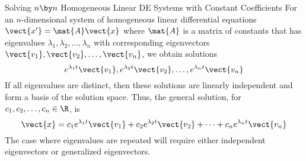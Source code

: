 \documentclass{beamer}
\begin{document}
\begin{frame}
\begin{block}{\small Solving $n\by n$ Homogeneous Linear DE Systems with Constant Coefficients}
For an $n$-dimensional system of homogeneous linear differential equations $\vect{x^\prime}=\mat{A}\vect{x}$ where $\mat{A}$ is a matrix of constants that has eigenvalues $\lambda_1,\lambda_2,\ldots,\lambda_n$ with corresponding eigenvectors $\vect{v_1}, \vect{v_2},\ldots,\vect{v_n}$, we obtain solutions
\begin{equation*}
e^{\lambda_1 t}\vect{v_1}, e^{\lambda_2 t}\vect{v_2},\ldots,e^{\lambda_n t}\vect{v_n}
\end{equation*}\pause
If all eigenvalues are distinct, then these solutions are linearly independent and form a basis of the solution space. Thus, the general solution, for $c_1,c_2,\ldots,c_n\in\R$, is
\begin{equation*}
\vect{x}=c_1 e^{\lambda_1 t}\vect{v_1}+c_2 e^{\lambda_2 t}\vect{v_2}+\cdots+c_n e^{\lambda_n t}\vect{v_n}
\end{equation*}\pause
The case where eigenvalues are repeated will require either independent eigenvectors or generalized eigenvectors.
\end{block}
\end{frame}
\end{document}
